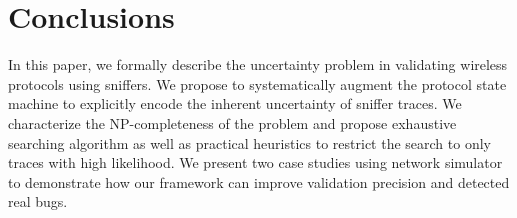 \section{Conclusions}
\label{sec:conclusion}

In this paper, we formally describe the uncertainty problem in validating
wireless protocols using sniffers. We propose to systematically augment the
protocol state machine to explicitly encode the inherent uncertainty of sniffer
traces. We characterize the NP-completeness of the problem and propose
exhaustive searching algorithm as well as practical heuristics to restrict the
search to only traces with high likelihood. We present two case studies using
\ns{} network simulator to demonstrate how our framework can improve validation
precision and detected real bugs.

\begin{comment}
Finally, we discuss a few challenges and future
directions.

\textbf{Verification Coverage.} Given a single sniffer trace, it is possible
that not all the states in the state machine are visited during the verification
process. For instance, a rate control state machine based on certain consecutive
packet losses patterns can not be verified if no such consecutive losses appear
in the sniffer trace. In general, given a protocol state machine, how to extract
the packet patterns for each state to be reached and how to alter the testing
such that such patterns can be observed?

\textbf{State Machine Generation.} We manually translated the protocols studied
in this paper into monitor state machines based on the source code, comments and
documentation. The process is time-consuming and error-prone. A more scalable
approach would be taking the protocol specification written in certain formal
language, and automatically translate such specification into state machines
that can be used for verification process.

\end{comment}
